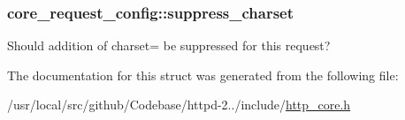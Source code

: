 \subsubsection[{\texorpdfstring{suppress\+\_\+charset}{suppress_charset}}]{ core\+\_\+request\+\_\+config\+::suppress\+\_\+charset}\hypertarget{structcore__request__config_a529ca0c5c75d76f20772a0184b816950}{}\label{structcore__request__config_a529ca0c5c75d76f20772a0184b816950}
Should addition of charset= be suppressed for this request? 

The documentation for this struct was generated from the following file\+:\begin{DoxyCompactItemize}
\item 
/usr/local/src/github/\+Codebase/httpd-\/2../include/\hyperlink{http__core_8h}{http\+\_\+core.\+h}\end{DoxyCompactItemize}
